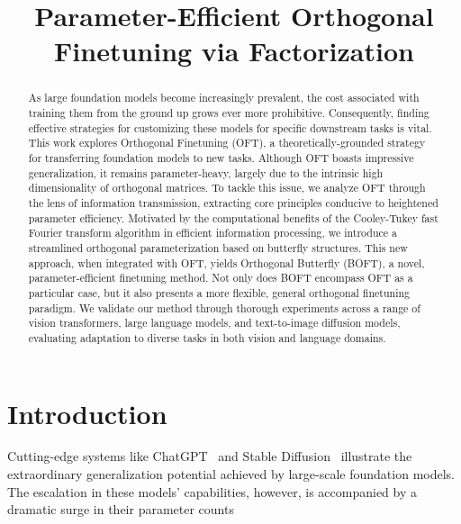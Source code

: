 \title{Parameter-Efficient Orthogonal Finetuning via Factorization}

\begin{abstract}
As large foundation models become increasingly prevalent, the cost associated with training them from the ground up grows ever more prohibitive. Consequently, finding effective strategies for customizing these models for specific downstream tasks is vital. This work explores Orthogonal Finetuning (OFT), a theoretically-grounded strategy for transferring foundation models to new tasks. Although OFT boasts impressive generalization, it remains parameter-heavy, largely due to the intrinsic high dimensionality of orthogonal matrices. To tackle this issue, we analyze OFT through the lens of information transmission, extracting core principles conducive to heightened parameter efficiency. Motivated by the computational benefits of the Cooley-Tukey fast Fourier transform algorithm in efficient information processing, we introduce a streamlined orthogonal parameterization based on butterfly structures. This new approach, when integrated with OFT, yields Orthogonal Butterfly (BOFT), a novel, parameter-efficient finetuning method. Not only does BOFT encompass OFT as a particular case, but it also presents a more flexible, general orthogonal finetuning paradigm. We validate our method through thorough experiments across a range of vision transformers, large language models, and text-to-image diffusion models, evaluating adaptation to diverse tasks in both vision and language domains.
\end{abstract}

\section{Introduction}

Cutting-edge systems like ChatGPT~\cite{brown2020language,chen2021evaluating} and Stable Diffusion~\cite{rombach2022high} illustrate the extraordinary generalization potential achieved by large-scale foundation models. The escalation in these models' capabilities, however, is accompanied by a dramatic surge in their parameter counts

